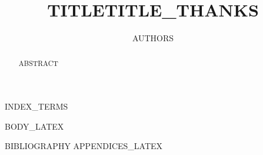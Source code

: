 \documentclass[conference,onecolumn]{IEEEtran}
\title{{{TITLE}}{{TITLE_THANKS}}}
\author{{{AUTHORS}}}
\begin{document}
\maketitle

\begin{abstract}
{{ABSTRACT}}
\end{abstract}

\begin{IEEEkeywords}
{{INDEX_TERMS}}
\end{IEEEkeywords}

{{BODY_LATEX}}

{{BIBLIOGRAPHY}}
{{APPENDICES_LATEX}}
\end{document}
